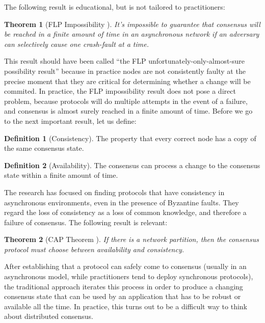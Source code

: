 \documentclass[11pt,a4paper]{article}
\theoremstyle{plain}
\newtheorem{thm}{Theorem}
\theoremstyle{definition}
\newtheorem{defn}{Definition}
\begin{document}
The following result is educational, but is not tailored to practitioners:

\begin{thm}[FLP Impossibility \cite{FLP}]
It's impossible to guarantee that consensus will be reached in a finite amount of time in an asynchronous network if an adversary can selectively cause one crash-fault at a time.
\end{thm}

This result should have been called ``the FLP unfortunately-only-almost-sure possibility result'' because in practice nodes are not consistently faulty at the precise moment that they are critical for determining whether a change will be commited. In practice, the FLP impossibility result does not pose a direct problem, because protocols will do multiple attempts in the event of a failure, and consensus is almost surely reached in a finite amount of time. Before we go to the next important result, let us define:

\begin{defn}[Consistency]
The property that every correct node has a copy of the same consensus state.
\end{defn}

\begin{defn}[Availability]
The consensus can process a change to the consensus state within a finite amount of time.
\end{defn}

The research has focused on finding protocols that have consistency in asynchronous environments, even in the presence of Byzantine faults. They regard the loss of consistency as a loss of common knowledge, and therefore a failure of consensus. The following result is relevant:

\begin{thm}[CAP Theorem \cite{CAP}]
If there is a network partition, then the consensus protocol must choose between availability and consistency.
\end{thm}

After establishing that a protocol can safely come to consensus (usually in an asynchronous model, while practitioners tend to deploy synchronous protocols), the traditional approach iterates this process in order to produce a changing consensus state that can be used by an application that has to be robust or available all the time. In practice, this turns out to be a difficult way to think about distributed consensus.
\end{document}
